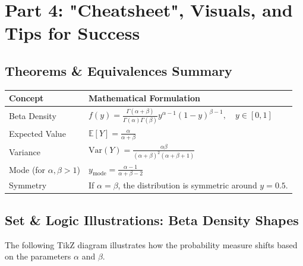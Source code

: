 \documentclass[11pt, a4paper]{article}
\theoremstyle{definition}
\theoremstyle{remark}
\newcommand{\E}{\mathbb{E}}
\begin{document}
\section{Part 4: "Cheatsheet", Visuals, and Tips for Success}

\subsection{Theorems \& Equivalences Summary}
\begin{table}[h!]
\centering
\renewcommand{\arraystretch}{1.5}
\begin{tabularx}{\textwidth}{l X}
\toprule
\textbf{Concept} & \textbf{Mathematical Formulation} \\
\midrule
Beta Density & $f(y) = \frac{\Gamma(\alpha+\beta)}{\Gamma(\alpha)\Gamma(\beta)} y^{\alpha-1}(1-y)^{\beta-1}, \quad y \in [0,1]$ \\
Expected Value & $\E[Y] = \frac{\alpha}{\alpha+\beta}$ \\
Variance & $\text{Var}(Y) = \frac{\alpha\beta}{(\alpha+\beta)^2(\alpha+\beta+1)}$ \\
Mode (for $\alpha, \beta > 1$) & $y_{\text{mode}} = \frac{\alpha-1}{\alpha+\beta-2}$ \\
Symmetry & If $\alpha = \beta$, the distribution is symmetric around $y = 0.5$. \\
\bottomrule
\end{tabularx}
\end{table}

\subsection{Set \& Logic Illustrations: Beta Density Shapes}
The following TikZ diagram illustrates how the probability measure shifts based on the parameters $\alpha$ and $\beta$.
\end{document}
